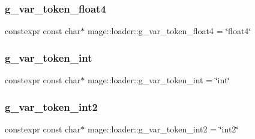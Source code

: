 \hypertarget{namespacemage_1_1loader_aaf283d156cc079b16c1b5821c2078c78}{}\label{namespacemage_1_1loader_aaf283d156cc079b16c1b5821c2078c78} 
\subsubsection{\texorpdfstring{g\+\_\+var\+\_\+token\+\_\+float4}{g\_var\_token\_float4}}
{\footnotesize\ttfamily constexpr const char$\ast$ mage\+::loader\+::g\+\_\+var\+\_\+token\+\_\+float4 = \char`\"{}float4\char`\"{}}

\hypertarget{namespacemage_1_1loader_a37db62978f9ca6fb022c2668ee544842}{}\label{namespacemage_1_1loader_a37db62978f9ca6fb022c2668ee544842} 
\subsubsection{\texorpdfstring{g\+\_\+var\+\_\+token\+\_\+int}{g\_var\_token\_int}}
{\footnotesize\ttfamily constexpr const char$\ast$ mage\+::loader\+::g\+\_\+var\+\_\+token\+\_\+int = \char`\"{}int\char`\"{}}

\hypertarget{namespacemage_1_1loader_a6ef08c6dd9504fbbdb2b151decc0e93f}{}\label{namespacemage_1_1loader_a6ef08c6dd9504fbbdb2b151decc0e93f} 
\subsubsection{\texorpdfstring{g\+\_\+var\+\_\+token\+\_\+int2}{g\_var\_token\_int2}}
{\footnotesize\ttfamily constexpr const char$\ast$ mage\+::loader\+::g\+\_\+var\+\_\+token\+\_\+int2 = \char`\"{}int2\char`\"{}}

\hypertarget{namespacemage_1_1loader_a4d46ae8b522ffdf597cbfef8ff300f36}{}\label{namespacemage_1_1loader_a4d46ae8b522ffdf597cbfef8ff300f36} 
